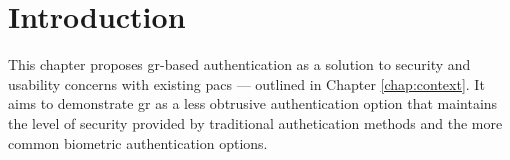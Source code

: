 \section{Introduction}
\label{sec:new-ideas-introduction}

This chapter proposes \ac{gr}-based authentication as a solution to security and usability concerns with existing \ac{pacs} --- outlined in Chapter \ref{chap:context}.
It aims to demonstrate \ac{gr} as a less obtrusive authentication option that maintains the level of security provided by traditional authetication methods and the more common biometric authentication options.
